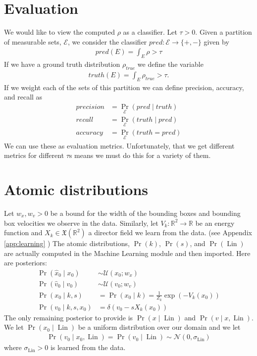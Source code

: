 \documentclass[12pt]{amsart}
\DeclareMathOperator{\Lin}{Lin}
\begin{document}
\section{Evaluation}
We would like to view the computed $\rho$ as a classifier.
Let $\tau > 0$. Given a partition of measurable sets, $\mathcal{E}$, we consider the classifier $pred: \mathcal{E} \to \{ +, - \}$ given by
\begin{align*}
	pred(E) = \int_E \rho  > \tau
\end{align*}
If we have a ground truth distribution $\rho_{true}$ we define the variable
\begin{align*}
	truth(E) = \int_E \rho_{true} > \tau.
\end{align*}
If we weight each of the sets of this partition we can define precision, accuracy, and recall as
\begin{align*}
	precision &= \Pr_{\mathcal{E}} ( pred \mid truth ) \\
	recall &= \Pr_{\mathcal{E}} ( truth \mid  pred ) \\
	accuracy &= \Pr_{\mathcal{E}}( truth = pred )
\end{align*}
We can use these as evaluation metrics.  Unfortunately, that we get different metrics for different $\tau$s means we must do this for a variety of them.

\appendix

\section{Atomic distributions}
Let $w_x, w_v  > 0$ be a bound for the width of the bounding boxes and bounding box velocities we observe in the data.
Similarly, let $V_k: \mathbb{R}^2 \to \mathbb{R}$ be an energy function and $X_k \in \mathfrak{X}( \mathbb{R}^2)$ a director field we learn from the data. (see Appendix \ref{app:learning} )
The atomic distributions, $\Pr(k)$, $\Pr(s)$, and $\Pr(\Lin)$ are actually computed in the Machine Learning module and then imported.
Here are posteriors:
\begin{align*}
	\Pr( \hat{x}_0 \mid x_0 ) &\sim \mathcal{U}( x_0 ; w_x ) \\
	\Pr( \hat{v}_0 \mid v_0 ) &\sim \mathcal{U}( v_0 ; w_v ) \\
	\Pr( x_0 \mid k,s ) &= \Pr(x_0 \mid k) = \frac{1}{Z_k} \exp \left( -V_k( x_0 ) \right) \\
	\Pr( v_0 \mid k,s,x_0) &= \delta( v_0 - s X_k(x_0) )
\end{align*}
The only remaining posterior to provide is $\Pr( x \mid \Lin )$ and $\Pr( v \mid x,\Lin )$.
We let $\Pr( x_0 \mid \Lin)$ be a uniform distribution over our domain and we let
\begin{align}
	\Pr( v_0 \mid x_0 , \Lin ) = \Pr( v_0 \mid \Lin ) \sim \mathcal{N}( 0, \sigma_{\Lin} ) \label{eq:v given x and Linear}
\end{align}
where $\sigma_{\Lin} > 0$ is learned from the data.
\end{document}
